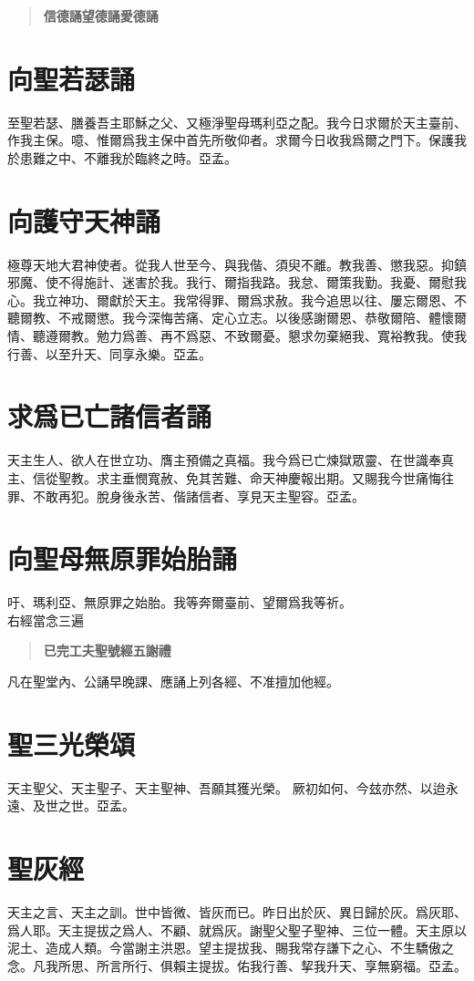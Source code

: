 \begin{quote}
\bfseries 信德誦\quad 望德誦\quad 愛德誦
\end{quote}

\section*{向聖若瑟誦}
至聖若瑟、膳養吾主耶穌之父、又極淨聖母瑪利亞之配。我今日求爾於天主臺前、作我主保。噫、惟爾爲我主保中首先所敬仰者。求爾今日收我爲爾之門下。保護我於患難之中、不離我於臨終之時。{\cspace}亞孟。

\section*{向護守天神誦}
極尊天地大君神使者。從我人世至今、與我偕、須臾不離。教我善、懲我惡。抑鎮邪魔、使不得施計、迷害於我。我行、爾指我路。我怠、爾策我勤。我憂、爾慰我心。我立神功、爾獻於天主。我常得罪、爾爲求赦。我今追思以往、屢忘爾恩、不聽爾教、不戒爾懲。我今深悔苦痛、定心立志。以後感謝爾恩、恭敬爾陪、體懷爾情、聽遵爾教。勉力爲善、再不爲惡、不致爾憂。懇求勿棄絕我、寬裕教我。使我行善、以至升天、同享永樂。{\cspace}亞孟。

\section*{求爲已亡諸信者誦}
天主生人、欲人在世立功、膺主預備之真福。我今爲已亡煉獄眾靈、在世識奉真主、信從聖教。求主垂憫寬赦、免其苦難、命天神慶報出期。又賜我今世痛悔往罪、不敢再犯。脫身後永苦、偕諸信者、享見天主聖容。{\cspace}亞孟。

\section*{向聖母無原罪始胎誦}
吁、瑪利亞、無原罪之始胎。我等奔爾臺前、望爾爲我等祈。\\ {\small 右經當念三遍}
\begin{quote}
\bfseries 已完工夫\quad 聖號經\quad  五謝禮
\end{quote}
{\small 凡在聖堂內、公誦早晚課、應誦上列各經、不准擅加他經。}

\section*{聖三光榮頌}
天主聖父、天主聖子、天主聖神、吾願其獲光榮。 厥初如何、今玆亦然、以迨永遠、及世之世。{\cspace}亞孟。

\section*{聖灰經}
天主之言、天主之訓。世中皆微、皆灰而已。昨日出於灰、異日歸於灰。爲灰耶、爲人耶。天主提拔之爲人、不顧、就爲灰。謝聖父聖子聖神、三位一體。天主原以泥土、造成人類。今當謝主洪恩。望主提拔我、賜我常存謙下之心、不生驕傲之念。凡我所思、所言所行、俱賴主提拔。佑我行善、挈我升天、享無窮福。{\cspace}亞孟。

